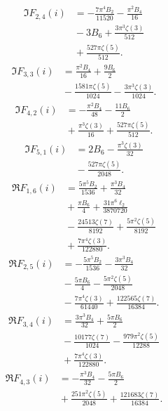 \begin{align*}
\Im F_{2,4}(i) &=-\frac{7 \pi^{4} B_{2}}{11520}-\frac{\pi^{2} B_{4}}{16} \\
 &{}-3 B_{6}+\frac{3 \pi^{3} \zeta\left(3\right)}{512} \\
 &{}+\frac{527 \pi \zeta\left(5\right)}{512}.
\end{align*}
\begin{align*}
\Im F_{3,3}(i) &=\frac{\pi^{2} B_{4}}{16}+\frac{9 B_{6}}{2} \\
 &{}-\frac{1581 \pi \zeta\left(5\right)}{1024}-\frac{3 \pi^{3} \zeta\left(3\right)}{1024}.
\end{align*}
\begin{align*}
\Im F_{4,2}(i) &=-\frac{\pi^{2} B_{4}}{48}-\frac{11 B_{6}}{2} \\
 &{}+\frac{\pi^{3} \zeta\left(3\right)}{16}+\frac{527 \pi \zeta\left(5\right)}{512}.
\end{align*}
\begin{align*}
\Im F_{5,1}(i) &=2 B_{6}-\frac{\pi^{3} \zeta\left(3\right)}{32} \\
 &{}-\frac{527 \pi \zeta\left(5\right)}{2048}.
\end{align*}
\begin{align*}
\Re F_{1,6}(i) &=\frac{5 \pi^{5} B_{2}}{1536}+\frac{\pi^{3} B_{4}}{32} \\
 &{}+\frac{\pi B_{6}}{4}+\frac{31 \pi^{6} \ell_{2}}{3870720} \\
 &{}-\frac{24513 \zeta\left(7\right)}{8192}+\frac{5 \pi^{2} \zeta\left(5\right)}{8192} \\
 &{}+\frac{7 \pi^{4} \zeta\left(3\right)}{122880}.
\end{align*}
\begin{align*}
\Re F_{2,5}(i) &=-\frac{5 \pi^{5} B_{2}}{1536}-\frac{3 \pi^{3} B_{4}}{32} \\
 &{}-\frac{5 \pi B_{6}}{4}-\frac{5 \pi^{2} \zeta\left(5\right)}{2048} \\
 &{}-\frac{7 \pi^{4} \zeta\left(3\right)}{61440}+\frac{122565 \zeta\left(7\right)}{16384}.
\end{align*}
\begin{align*}
\Re F_{3,4}(i) &=\frac{3 \pi^{3} B_{4}}{32}+\frac{5 \pi B_{6}}{2} \\
 &{}-\frac{10177 \zeta\left(7\right)}{1024}-\frac{979 \pi^{2} \zeta\left(5\right)}{12288} \\
 &{}+\frac{7 \pi^{4} \zeta\left(3\right)}{122880}.
\end{align*}
\begin{align*}
\Re F_{4,3}(i) &=-\frac{\pi^{3} B_{4}}{32}-\frac{5 \pi B_{6}}{2} \\
 &{}+\frac{251 \pi^{2} \zeta\left(5\right)}{2048}+\frac{121683 \zeta\left(7\right)}{16384}.
\end{align*}
